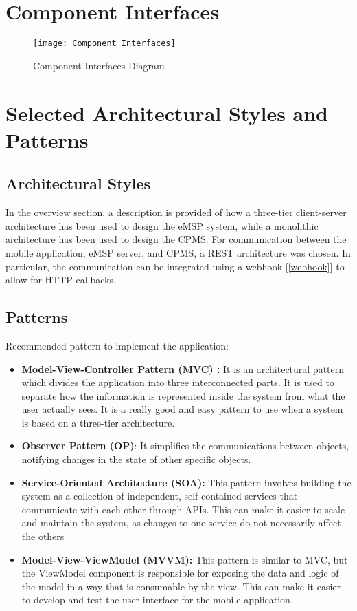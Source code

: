 \section{Component Interfaces} %
\label{sec:componentInterfaces}
\begin{figure}[H]
            \begin{center}
            \texttt{[image: Component Interfaces]}
            \caption{Component Interfaces Diagram}
            \label{fig:ComponentInterfaces}
            \end{center}
        \end{figure}
\section{Selected Architectural Styles and Patterns} %
\label{sec:artchitecturalStylesPatterns}
\subsection{Architectural Styles}
In the overview section, a description is provided of how a three-tier client-server architecture has been used to design the eMSP system, while a monolithic architecture has been used to design the CPMS. For communication between the mobile application, eMSP server, and CPMS, a REST architecture was chosen. In particular, the communication can be integrated using a webhook [\ref{webhook}] to allow for HTTP callbacks.
\label{subsec:architecturalStyles}
\subsection{Patterns}
Recommended pattern to implement the application:
\begin{itemize}

\item \textbf{Model-View-Controller Pattern (MVC) : }It is an architectural pattern which divides
the application into three interconnected parts. It is used to separate how the information is represented inside the system from what the user actually sees. It is a really good and easy pattern to use when a system is based on a three-tier architecture.
\item \textbf{Observer Pattern (OP)}: It simplifies the communications between objects, notifying changes in the state of other specific objects.
\item \textbf {Service-Oriented Architecture (SOA): } This pattern involves building the system as a collection of independent, self-contained services that communicate with each other through APIs. This can make it easier to scale and maintain the system, as changes to one service do not necessarily affect the others
\item \textbf{Model-View-ViewModel (MVVM): } This pattern is similar to MVC, but the ViewModel component is responsible for exposing the data and logic of the model in a way that is consumable by the view. This can make it easier to develop and test the user interface for the mobile application.
\end{itemize}
\label{subsec:patterns}
